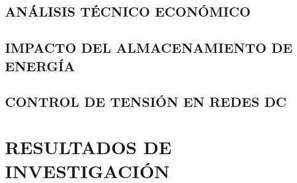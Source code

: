 \documentclass[12pt, letterpaper]{report}
\begin{document}
\section{ANÁLISIS TÉCNICO ECONÓMICO}

\section{IMPACTO DEL ALMACENAMIENTO DE ENERGÍA}
\section{CONTROL DE TENSIÓN EN REDES DC}
\chapter{RESULTADOS DE INVESTIGACIÓN}

\label{cap:resultados}



%
\end{document}
